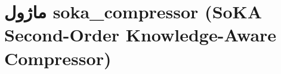 \section{ماژول soka\_compressor (SoKA Second-Order Knowledge-Aware Compressor)}
\label{sec:module_soka_compressor}
